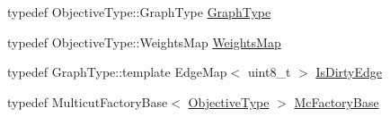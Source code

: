 \begin{DoxyCompactItemize}
typedef Objective\+Type\+::\+Graph\+Type \hyperlink{classnifty_1_1graph_1_1optimization_1_1multicut_1_1BlockMulticut_a1b57836064e7b70edea2f286436e66f4}{Graph\+Type}
\item 
typedef Objective\+Type\+::\+Weights\+Map \hyperlink{classnifty_1_1graph_1_1optimization_1_1multicut_1_1BlockMulticut_aede83b2ab0b90027a3bc8534f1e3df9f}{Weights\+Map}
\item 
typedef Graph\+Type\+::template Edge\+Map$<$ uint8\+\_\+t $>$ \hyperlink{classnifty_1_1graph_1_1optimization_1_1multicut_1_1BlockMulticut_a0044d2f41c0eb7867b4a4fd18048158a}{Is\+Dirty\+Edge}
\item 
typedef Multicut\+Factory\+Base$<$ \hyperlink{classnifty_1_1graph_1_1optimization_1_1multicut_1_1BlockMulticut_abaa8f874df71e8fc875ddc3928768f92}{Objective\+Type} $>$ \hyperlink{classnifty_1_1graph_1_1optimization_1_1multicut_1_1BlockMulticut_a568ee0171f58ef95b5b32a4d15aaf2f5}{Mc\+Factory\+Base}
\end{DoxyCompactItemize}
